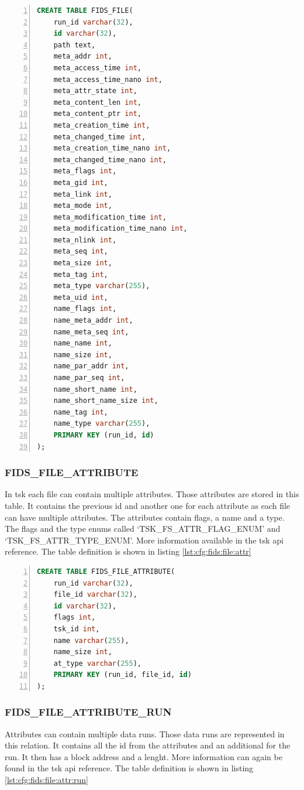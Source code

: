 \begin{lstlisting}[language=sql, numbers=left, caption=Fids File Table Definition, label=lst:cfg:fids:file]
CREATE TABLE FIDS_FILE(
	run_id varchar(32),
	id varchar(32),
	path text, 
	meta_addr int,
	meta_access_time int,
	meta_access_time_nano int,
	meta_attr_state int,
	meta_content_len int,
	meta_content_ptr int,
	meta_creation_time int,
	meta_changed_time int,
	meta_creation_time_nano int,
	meta_changed_time_nano int,
	meta_flags int,
	meta_gid int,
	meta_link int,
	meta_mode int,
	meta_modification_time int,
	meta_modification_time_nano int,
	meta_nlink int,
	meta_seq int,
	meta_size int,
	meta_tag int,
	meta_type varchar(255),
	meta_uid int,
	name_flags int,
	name_meta_addr int,
	name_meta_seq int,
	name_name int,
	name_size int,
	name_par_addr int,
	name_par_seq int,
	name_short_name int,
	name_short_name_size int,
	name_tag int,
	name_type varchar(255),
	PRIMARY KEY (run_id, id)
);
\end{lstlisting}

\subsubsection{FIDS\_FILE\_ATTRIBUTE}

In \gls{tsk} each file can contain multiple attributes. Those attributes are stored in this table. It contains the previous \gls{id} and another one for each attribute as each file can have multiple attributes. The attributes contain flags, a name and a type. The flags and the type enums called `TSK\_FS\_ATTR\_FLAG\_ENUM' and `TSK\_FS\_ATTR\_TYPE\_ENUM'. More information available in the \gls{tsk} \gls{api} reference. \cite{tsk:attr:struct,tsk:file:header} The table definition is shown in listing \ref{lst:cfg:fids:file:attr}

\begin{lstlisting}[language=sql, numbers=left, caption=Fids File Attribute Table Definition, label=lst:cfg:fids:file:attr]
CREATE TABLE FIDS_FILE_ATTRIBUTE(
	run_id varchar(32),
	file_id varchar(32),
	id varchar(32),
	flags int,
	tsk_id int,
	name varchar(255),
	name_size int,
	at_type varchar(255), 
	PRIMARY KEY (run_id, file_id, id)
);
\end{lstlisting}

\subsubsection{FIDS\_FILE\_ATTRIBUTE\_RUN}

Attributes can contain multiple data runs. Those data runs are represented in this relation. It contains all the \gls{id} from the attributes and an additional for the run. It then has a block address and a lenght. More information can again be found in the \gls{tsk} \gls{api} reference. \cite{tsk:attr:run:struct} The table definition is shown in listing \ref{lst:cfg:fids:file:attr:run}

